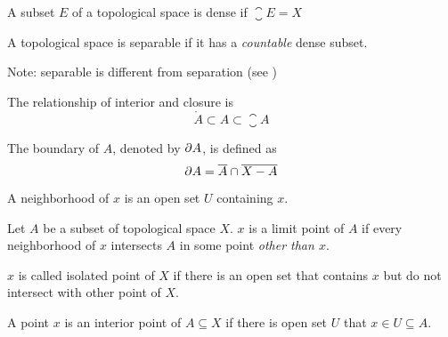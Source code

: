 \begin{definition}
    A subset $E$ of a topological space is dense if $\closure{E} = X$
\end{definition}

\begin{definition}\label{separable}
    A topological space is separable if it has a \emph{countable} dense subset.
    
    Note: separable is different from separation (see )
\end{definition}



\begin{theorem}
    The relationship of interior and closure is
\begin{equation}
    \mathring{A} \subset A \subset \closure{A}
\end{equation}
\end{theorem}



\begin{definition}
    The boundary of $A$, denoted by $\partial A$, is defined as
    \begin{equation}
        \partial A = \overline{A} \cap \overline{X - A}
    \end{equation}
\end{definition}


\begin{definition}
    A neighborhood of $x$ is an open set $U$ containing $x$.
\end{definition}


\begin{definition}
    Let $A$ be a subset of topological space $X$. $x$ is a limit point of $A$ if every neighborhood of $x$ intersects $A$ in some point \emph{other than $x$}.
\end{definition}

\begin{definition}
    $x$ is called isolated point of $X$ if there is an open set that contains $x$ but do not intersect with other point of $X$.
\end{definition}

\begin{definition}
    A point $x$ is an interior point of $A \subseteq X$ if there is open set $U$ that $x \in U \subseteq A$.
\end{definition}

